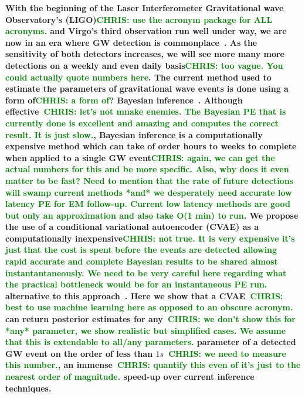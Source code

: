 \documentclass[%
showpacs,
 amsmath,amssymb,
 aps,
 twocolumn,
 prl,
 reprint,
floatfix,
]{revtex4-1}
\newcommand{\chris}[1]{\textbf{\textcolor{green}{CHRIS: #1}}}
\begin{document}
%
%
%
\textbf{ 
%
%
With the beginning of the Laser Interferometer Gravitational wave
Observatory's (LIGO)\chris{use the acronym package for ALL acronyms.} and
Virgo's third observation run well under way, we are now in an era where
\ac{GW} detection is commonplace~\cite{PhysRevLett.116.061102,
PhysRevX.6.041015,PhysRevLett.119.161101}. As the sensitivity of both detectors
increases, we will see more many more detections on a weekly and even daily
basis\chris{too vague. You could actually quote numbers here}.  The current
method used to estimate the parameters of gravitational wave events is done
using a form of\chris{a form of? } Bayesian inference~\cite{1409.7215}.
%
%
Although effective~\chris{let's not mnake enemies. The Bayesian PE that is
currently done is excellent and amazing and computes the correct result. It is
just slow.}, Bayesian inference is a computationally expensive method which can
take of order hours to weeks to complete when applied to a single GW
event\chris{again, we can get the actual numbers for this and be more specific.
Also, why does it even matter to be fast? Need to mention that the rate of
future detections will swamp current methods *and* we desperately need accurate
low latency PE for EM follow-up.  Current low latency methods are good but only
an approximation and also take O(1 min) to run}. We propose the use of a
conditional variational autoencoder (CVAE) as a computationally
inexpensive\chris{not true. It is very expensive it's just that the cost is
spent before the events are detected allowing rapid accurate and complete
Bayesian results to be shared almost instantantaneously.  We need to be very
careful here regarding what the practical bottleneck would be for an
instantaneous PE run.} alternative to this
approach~\cite{1904.06264,1812.04405}. 
%
%
Here we show that a CVAE~\chris{best to
use machine learning here as opposed to an obscure acronym.} can return
posterior estimates for any~\chris{we don't show this for *any* parameter, we
show realistic but simplified cases. We assume that this is extendable to
all/any parameters.} parameter of a detected \ac{GW} event on the order of less
than $1s$~\chris{we need to measure this number.}, an immense~\chris{quantify
this even of it's just to the nearest order of magnitude.} speed-up over
current inference techniques.}
\end{document}
